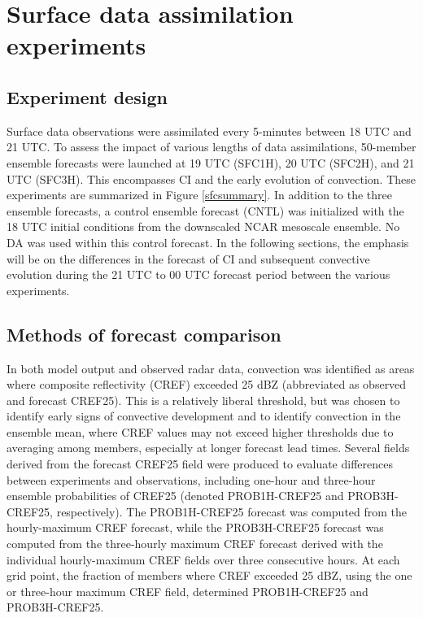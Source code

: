 \section{Surface data assimilation experiments}
\subsection{Experiment design}
Surface data observations were assimilated every 5-minutes between 18 UTC and 21 UTC. To assess the impact of various lengths of data assimilations, 50-member ensemble forecasts were launched at 19 UTC (SFC1H), 20 UTC (SFC2H), and 21 UTC (SFC3H). This encompasses CI and the early evolution of convection. These experiments are summarized in Figure \ref{sfcsummary}. In addition to the three ensemble forecasts, a control ensemble forecast (CNTL) was initialized with the 18 UTC initial conditions from the downscaled NCAR mesoscale ensemble. No DA was used within this control forecast. In the following sections, the emphasis will be on the differences in the forecast of CI and subsequent convective evolution during the 21 UTC to 00 UTC forecast period between the various experiments.

\subsection{Methods of forecast comparison}
\label{fcstcompare}
In both model output and observed radar data, convection was identified as areas where composite reflectivity (CREF) exceeded 25 dBZ (abbreviated as observed and forecast CREF25). This is a relatively liberal threshold, but was chosen to identify early signs of convective development and to identify convection in the ensemble mean, where CREF values may not exceed higher thresholds due to averaging among members, especially at longer forecast lead times. Several fields derived from the forecast CREF25 field were produced to evaluate differences between experiments and observations, including one-hour and three-hour ensemble probabilities of CREF25 (denoted PROB1H-CREF25 and PROB3H-CREF25, respectively). The PROB1H-CREF25 forecast was computed from the hourly-maximum CREF forecast, while the PROB3H-CREF25 forecast was computed from the three-hourly maximum CREF forecast derived with the individual hourly-maximum CREF fields over three consecutive hours. At each grid point, the fraction of members where CREF exceeded 25 dBZ, using the one or three-hour maximum CREF field, determined PROB1H-CREF25 and PROB3H-CREF25.

